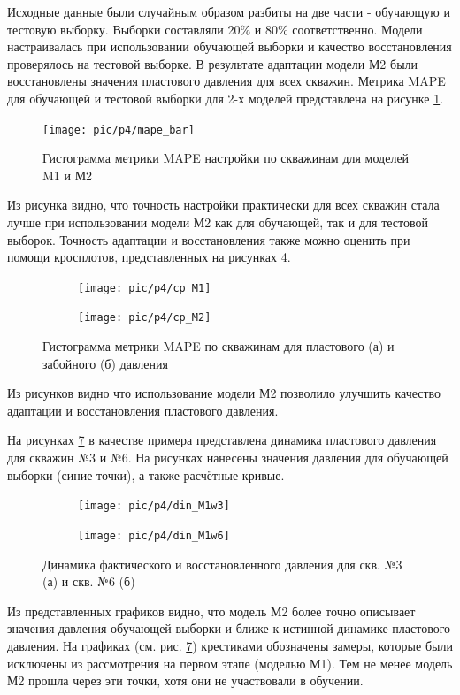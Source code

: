 \documentclass[14pt]{article}
\begin{document}
Исходные данные были случайным образом разбиты на две части - обучающую и тестовую выборку. Выборки составляли 20\% и 80\% соответственно. Модели настраивалась при использовании обучающей выборки и качество восстановления проверялось на тестовой выборке.
В результате адаптации модели М2 были восстановлены значения пластового давления для всех скважин. Метрика MAPE для обучающей и тестовой выборки для 2-х моделей представлена на рисунке \ref{fig:bar_mape_s1s2}.
\begin{figure}
	\centering
	\texttt{[image: pic/p4/mape\_bar]}
	\caption{Гистограмма метрики MAPE настройки по скважинам для моделей M1 и М2}
	\label{fig:bar_mape_s1s2}
\end{figure}
Из рисунка видно, что точность настройки практически для всех скважин стала лучше при использовании модели М2 как для обучающей, так и для тестовой выборок.
Точность адаптации и восстановления также можно оценить при помощи кросплотов, представленных на рисунках \ref{fig:well9_cp}.
\begin{figure}[!htb]
	\begin{subfigure}[b]{0.45\linewidth}
		\texttt{[image: pic/p4/cp\_M1]}
		\caption{}
		\label{fig:well9_cp_m1}
	\end{subfigure}
	\begin{subfigure}[b]{0.45\linewidth}
		\texttt{[image: pic/p4/cp\_M2]}
		\caption{}
		\label{fig:well9_cp_m2}
	\end{subfigure}
	\label{fig:well9_cp}
	\caption{Гистограмма метрики MAPE по скважинам для пластового (а) и забойного (б) давления}
\end{figure}
Из рисунков видно что использование модели М2 позволило улучшить качество адаптации и восстановления пластового давления.

На рисунках \ref{fig:din_9well_press} в качестве примера представлена динамика пластового давления для скважин №3 и №6. На рисунках нанесены значения давления для обучающей выборки (синие точки), а также расчётные кривые.

 \begin{figure}[!htb]
	\centering
	\begin{subfigure}[b]{0.9\linewidth}
		\texttt{[image: pic/p4/din\_M1w3]}
		\caption{}
		\label{fig:din_9well_press_3}
	\end{subfigure}
	\begin{subfigure}[b]{0.9\linewidth}
		\texttt{[image: pic/p4/din\_M1w6]}
		\caption{}
		\label{fig:din_9well_press_6}
	\end{subfigure}
	\caption{Динамика фактического и восстановленного давления для скв. №3 (а) и скв. №6 (б)}
	\label{fig:din_9well_press}
\end{figure}
Из представленных графиков видно, что модель М2 более точно описывает значения давления обучающей выборки и ближе к истинной динамике пластового давления.
На графиках (см. рис. \ref{fig:din_9well_press}) крестиками обозначены замеры, которые были исключены из рассмотрения на первом этапе (моделью М1). Тем не менее модель М2 прошла через эти точки, хотя они не участвовали в обучении.
\end{document}
